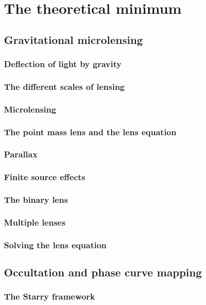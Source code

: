 \documentclass[]{report}
\begin{document}
\chapter{The theoretical minimum}

\section{Gravitational microlensing}
\subsection{Deflection of light by gravity}
\subsection{The different scales of lensing}
\subsection{Microlensing}
\subsection{The point mass lens and the lens equation}
\subsection{Parallax}
\subsection{Finite source effects}
\subsection{The binary lens}
\subsection{Multiple lenses}
\subsection{Solving the lens equation}

\section{Occultation and phase curve mapping}
\subsection{The Starry framework}
\end{document}
